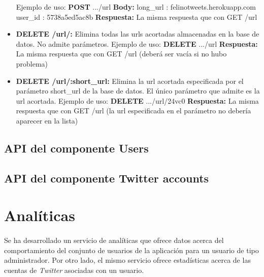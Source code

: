 \documentclass[a4paper]{article}
\begin{document}
\begin{itemize}
		Ejemplo de uso:
		\newline
		\textbf{POST} .../url
		\newline \textbf{Body:} 
		\newline long\_url : felinotweets.herokuapp.com
		\newline user\_id : 5738a5ed5ac8b
		\newline \textbf{Respuesta:}
		\newline La misma respuesta que con GET /url
		\item \textbf{DELETE /url/:} Elimina todas las urls acortadas almacenadas en la base de datos. No admite parámetros.
		Ejemplo de uso:
		\newline
		\textbf{DELETE} .../url
		\newline \textbf{Respuesta:}
		\newline La misma respuesta que con GET /url (deberá ser vacía si no hubo problema)
		\item \textbf{DELETE /url/:short\_url:} Elimina la url acortada especificada por el parámetro short\_url de la base de datos. El único parámetro que admite es la url acortada.
		Ejemplo de uso:
		\newline
		\textbf{DELETE} .../url/24vc0
		\newline \textbf{Respuesta:}
		\newline La misma respuesta que con GET /url (la url especificada en el parámetro no debería aparecer en la lista)
	\end{itemize}
	
	\subsection{API del componente Users}
	
	\subsection{API del componente Twitter accounts}
\section{Analíticas}

	\paragraph{} Se ha desarrollado un servicio de analíticas que ofrece datos acerca del comportamiento del conjunto de usuarios de la aplicación para un usuario de tipo administrador. Por otro lado, el mismo servicio ofrece estadísticas acerca de las cuentas de \textit{Twitter} asociadas con un usuario.
	
\end{document}
